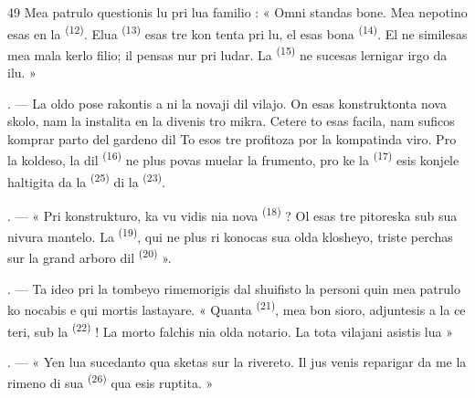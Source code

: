 \begin{VUpage}[51]{49}
\VUblancAlinea
Mea patrulo questionis lu pri lua familio :\nl
« Omni standas bone. Mea nepotino esas en\nl
la  \textsuperscript{(12)}. Elua  \textsuperscript{(13)} esas tre kon\cc
tenta pri lu, el esas bona  \textsuperscript{(14)}. El ne\nl
similesas mea mala kerlo filio; il pensas nur\nl
pri ludar. La  \textsuperscript{(15)} ne sucesas lernigar\nl
irgo da ilu. »

\VUsaut{3.0mm}
\VUsaut{3.0mm}

. --- La oldo pose rakontis a ni la novaji\nl
dil vilajo. On esas konstruktonta nova skolo,\nl
nam la instalita en la  divenis\nl
tro mikra. Cetere to esas facila, nam suficos\nl
komprar parto del gardeno dil  To\nl
esos tre profitoza por la kompatinda viro. Pro\nl
la koldeso, la  dil  \textsuperscript{(16)} ne\nl
plus povas muelar la frumento, pro ke la\nl
{} \textsuperscript{(17)} esis konjele haltigita da la  \textsuperscript{(25)}\nl
di la  \textsuperscript{(23)}.

. --- « Pri konstrukturo, ka vu vidis nia\nl
nova  \textsuperscript{(18)} ? Ol esas tre pitoreska sub sua\nl
nivura mantelo. La  \textsuperscript{(19)}, qui ne plus ri\cc
konocas sua olda klosheyo, triste perchas sur\nl
la grand arboro dil  \textsuperscript{(20)} ».

. --- Ta ideo pri la tombeyo rimemorigis\nl
dal shuifisto la personi quin mea patrulo ko\cc
nocabis e qui mortis lastayare. « Quanta\nl
{} \textsuperscript{(21)}, mea bon sioro, adjuntesis a la ce\cc
teri, sub la  \textsuperscript{(22)} ! La morto falchis nia\nl
olda notario. La tota vilajani asistis lua \cc
{} »

. --- « Yen lua sucedanto qua sketas sur\nl
la rivereto. Il jus venis reparigar da me la\nl
rimeno di sua  \textsuperscript{(26)} qua esis ruptita. »
\end{VUpage}

